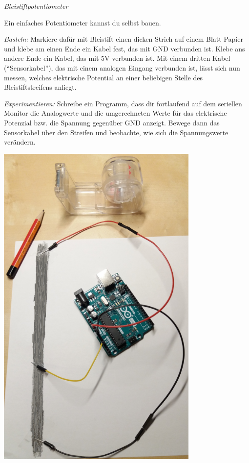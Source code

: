 \begin{aufgabe}\emph{Bleistiftpotentiometer}
	
	\medskip
	\begin{minipage}{0.6\textwidth}
		Ein einfaches Potentiometer kannst du selbst bauen. 
		
		\smallskip
		\emph{Basteln:} Markiere dafür mit Bleistift einen dicken Strich auf einem Blatt Papier und klebe am einen Ende ein Kabel fest, das mit GND verbunden ist. Klebe ans andere Ende ein Kabel, das mit 5V verbunden ist. Mit einem dritten Kabel (\enquote{Sensorkabel}), das mit einem analogen Eingang verbunden ist, lässt sich nun messen, welches elektrische Potential an einer beliebigen Stelle des Bleistiftstreifens anliegt.
		
		\smallskip
		\emph{Experimentieren:}	Schreibe ein Programm, dass dir fortlaufend auf dem seriellen Monitor die Analogwerte und die umgerechneten Werte für das elektrische Potenzial bzw. die Spannung gegenüber GND anzeigt. Bewege dann das Sensorkabel über den Streifen und beobachte, wie sich die Spannungswerte verändern.
	\end{minipage}
	\hfill
	\begin{minipage}{0.39\textwidth}
		\centering
		\includegraphics[width=0.75\textwidth]{./pics/bleistiftpoti-klein.png}
	\end{minipage}
	

\end{aufgabe}

